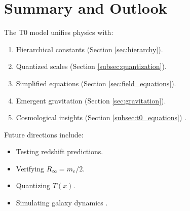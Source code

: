 \documentclass[12pt,a4paper]{article}
\newcommand{\Tfield}{T(x)}
\begin{document}
	\section{Summary and Outlook}
	\label{sec:outlook}
	
	The T0 model unifies physics with:
	\begin{enumerate}
		\item Hierarchical constants (Section \ref{sec:hierarchy}).
		\item Quantized scales (Section \ref{subsec:quantization}).
		\item Simplified equations (Section \ref{sec:field_equations}).
		\item Emergent gravitation (Section \ref{sec:gravitation}).
		\item Cosmological insights (Section \ref{subsec:t0_equations}) \cite{pascher_alphabeta_2025}.
	\end{enumerate}
	
	Future directions include:
	\begin{itemize}
		\item Testing redshift predictions.
		\item Verifying \(R_\infty = m_e/2\).
		\item Quantizing \(\Tfield\).
		\item Simulating galaxy dynamics \cite{pascher_galaxies_2025}.
	\end{itemize}
	
\end{document}

